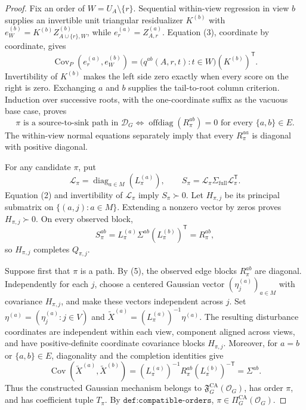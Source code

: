 \documentclass{article}
\begin{document}
\begin{proof}
Fix an order of \(W=U_A\setminus\{r\}\).  Sequential within-view regression in view \(b\) supplies an invertible unit triangular residualizer \(K^{(b)}\) with \(e_W^{(b)}=K^{(b)}Z_{A\cup\{r\},W}^{(b)}\), while \(e_r^{(a)}=Z_{A,r}^{(a)}\).  Equation (3), coordinate by coordinate, gives
\[
 \operatorname{Cov}_P(e_r^{(a)},e_W^{(b)})
 =\bigl(q^{ab}(A,r,t):t\in W\bigr)(K^{(b)})^{\mathsf T}.
 \tag{4}
\]
Invertibility of \(K^{(b)}\) makes the left side zero exactly when every score on the right is zero.  Exchanging \(a\) and \(b\) supplies the tail-to-root column criterion.  Induction over successive roots, with the one-coordinate suffix as the vacuous base case, proves
\[
 \pi\text{ is a source-to-sink path in }\mathcal D_G
 \Longleftrightarrow
 \operatorname{offdiag}(R_\pi^{ab})=0
 \text{ for every }\{a,b\}\in E.
 \tag{5}
\]
The within-view normal equations separately imply that every \(R_\pi^{aa}\) is diagonal with positive diagonal.

For any candidate \(\pi\), put
\[
 \mathcal L_\pi=\operatorname{diag}_{a\in M}(L_\pi^{(a)}),
 \qquad S_\pi=\mathcal L_\pi\Sigma_{\mathrm{full}}
 \mathcal L_\pi^{\mathsf T}.
\]
Equation (2) and invertibility of \(\mathcal L_\pi\) imply \(S_\pi\succ0\).  Let \(H_{\pi,j}\) be its principal submatrix on \(\{(a,j):a\in M\}\).  Extending a nonzero vector by zeros proves \(H_{\pi,j}\succ0\).  On every observed block,
\[
 S_\pi^{ab}=L_\pi^{(a)}\Sigma^{ab}(L_\pi^{(b)})^{\mathsf T}=R_\pi^{ab},
\]
so \(H_{\pi,j}\) completes \(Q_{\pi,j}\).

Suppose first that \(\pi\) is a path.  By (5), the observed edge blocks \(R_\pi^{ab}\) are diagonal.  Independently for each \(j\), choose a centered Gaussian vector \((\eta_j^{(a)})_{a\in M}\) with covariance \(H_{\pi,j}\), and make these vectors independent across \(j\).  Set \(\eta^{(a)}=(\eta_j^{(a)}:j\in V)\) and \(\widetilde X^{(a)}=(L_\pi^{(a)})^{-1}\eta^{(a)}\).  The resulting disturbance coordinates are independent within each view, component aligned across views, and have positive-definite coordinate covariance blocks \(H_{\pi,j}\).  Moreover, for \(a=b\) or \(\{a,b\}\in E\), diagonality and the completion identities give
\[
 \operatorname{Cov}(\widetilde X^{(a)},\widetilde X^{(b)})
 =(L_\pi^{(a)})^{-1}R_\pi^{ab}(L_\pi^{(b)})^{-\mathsf T}
 =\Sigma^{ab}.
 \tag{6}
\]
Thus the constructed Gaussian mechanism belongs to \(\mathfrak F_G^{\mathrm{CA}}(\mathcal O_G)\), has order \(\pi\), and has coefficient tuple \(T_\pi\).  By \(\texttt{def:compatible-orders}\), \(\pi\in\Pi_G^{\mathrm{CA}}(\mathcal O_G)\).


\end{proof}
\end{document}
